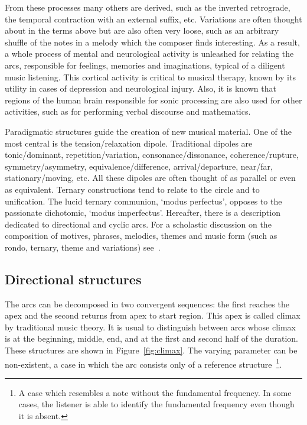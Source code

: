 From these processes many others are derived, such as the inverted retrograde, the temporal contraction with an external suffix, etc. Variations are often thought about in the terms above but are also often very loose, such as an arbitrary shuffle of the notes in a melody which the composer finds interesting. As a result, a whole process of mental and neurological activity is unleashed for relating the arcs, responsible for feelings, memories and imaginations, typical of a diligent music listening. This cortical activity is critical to
musical therapy, known by its utility in cases of depression and neurological injury. Also, it is known that regions of the human brain responsible for sonic processing are also used for other activities, such as for performing verbal discourse and mathematics.~\cite{Sacks,Roederer}

Paradigmatic structures guide the creation of new musical material.
One of the most central is the tension/relaxation dipole. Traditional dipoles are tonic/dominant, repetition/variation,
consonance/dissonance, coherence/rupture, symmetry/asymmetry,
equivalence/difference, arrival/departure, near/far, stationary/moving,
etc. All these dipoles are often thought of as parallel or even as equivalent.
Ternary constructions tend to relate to the circle and to unification. The
lucid ternary communion, `modus perfectus', opposes to the passionate
dichotomic, `modus imperfectus'. Hereafter, there is a description dedicated to
directional and cyclic arcs.
For a scholastic discussion on the composition of motives, phrases, melodies, themes and music form (such as rondo, ternary, theme and variations) see~\cite{Schoenberg}.

\subsection{Directional structures}\label{subsec:dir}
The arcs can be decomposed in two convergent sequences: the first reaches the apex and the second returns from apex to start region.
This apex is called climax by traditional music theory. It is
usual to distinguish between arcs whose climax is at the beginning, middle, end,
and at the first and second half of the duration. These structures are
shown in Figure~\ref{fig:climax}. The varying parameter can be non-existent, a case in which
the arc consists only of a reference structure~\cite{Schoenberg}\footnote{A
case which resembles a note without the fundamental frequency. In some cases, the listener is able to identify
the fundamental frequency even though it is absent.}.

